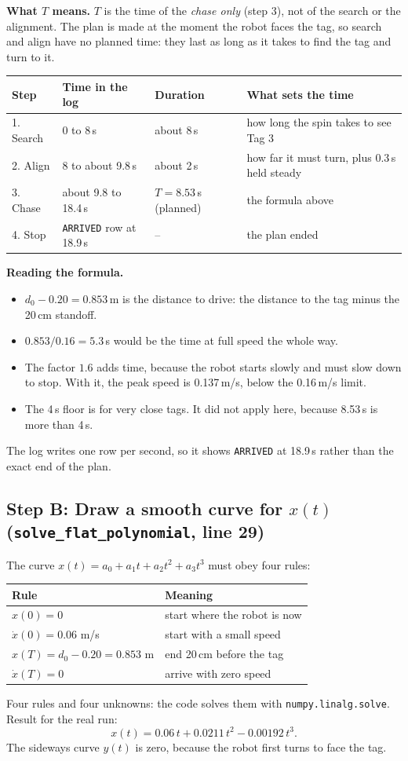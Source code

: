 \documentclass[11pt,a4paper]{article}
\begin{document}
\textbf{What $T$ means.} $T$ is the time of the \emph{chase only} (step 3), not of the search or the alignment. The plan is made at the moment the robot faces the tag, so search and align have no planned time: they last as long as it takes to find the tag and turn to it.
\begin{center}\small
\begin{tabular}{@{}llll@{}}
\toprule
\textbf{Step} & \textbf{Time in the log} & \textbf{Duration} & \textbf{What sets the time}\\
\midrule
1. Search & 0 to 8\,s & about 8\,s & how long the spin takes to see Tag 3\\
2. Align & 8 to about 9.8\,s & about 2\,s & how far it must turn, plus 0.3\,s held steady\\
3. Chase & about 9.8 to 18.4\,s & $T=8.53$\,s (planned) & the formula above\\
4. Stop & \texttt{ARRIVED} row at 18.9\,s & -- & the plan ended\\
\bottomrule
\end{tabular}
\end{center}
\textbf{Reading the formula.}
\begin{itemize}
  \item $d_0-0.20=0.853$\,m is the distance to drive: the distance to the tag minus the 20\,cm standoff.
  \item $0.853/0.16=5.3$\,s would be the time at full speed the whole way.
  \item The factor $1.6$ adds time, because the robot starts slowly and must slow down to stop. With it, the peak speed is 0.137\,m/s, below the 0.16\,m/s limit.
  \item The 4\,s floor is for very close tags. It did not apply here, because 8.53\,s is more than 4\,s.
\end{itemize}
The log writes one row per second, so it shows \texttt{ARRIVED} at 18.9\,s rather than the exact end of the plan.

\subsection*{Step B: Draw a smooth curve for $x(t)$ \quad(\texttt{solve\_flat\_polynomial}, line 29)}
The curve $x(t)=a_0+a_1t+a_2t^2+a_3t^3$ must obey four rules:
\begin{center}\small
\begin{tabular}{@{}ll@{}}
\toprule
\textbf{Rule} & \textbf{Meaning}\\
\midrule
$x(0)=0$ & start where the robot is now\\
$\dot x(0)=0.06$ m/s & start with a small speed\\
$x(T)=d_0-0.20=0.853$ m & end 20\,cm before the tag\\
$\dot x(T)=0$ & arrive with zero speed\\
\bottomrule
\end{tabular}
\end{center}
Four rules and four unknowns: the code solves them with \texttt{numpy.linalg.solve}. Result for the real run:
\[
x(t)=0.06\,t+0.0211\,t^2-0.00192\,t^3 .
\]
The sideways curve $y(t)$ is zero, because the robot first turns to face the tag.
\end{document}
